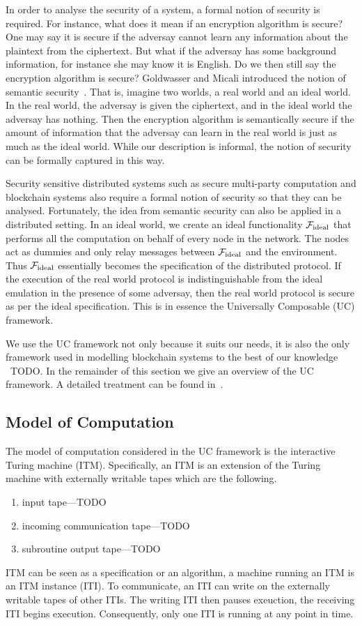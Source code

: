 In order to analyse the security of a system, a formal notion of security is required.
For instance, what does it mean if an encryption algorithm is secure?
One may say it is secure if the adversay cannot learn any information about the plaintext from the ciphertext.
But what if the adversay has some background information, for instance she may know it is English.
Do we then still say the encryption algorithm is secure?
Goldwasser and Micali introduced the notion of semantic security~\cite{goldwasser1982probabilistic}.
That is, imagine two worlds, a real world and an ideal world.
In the real world, the adversay is given the ciphertext,
and in the ideal world the adversay has nothing.
Then the encryption algorithm is semantically secure if the amount of information that the adversay can learn in the real world is just as much as the ideal world.
While our description is informal, the notion of security can be formally captured in this way.

Security sensitive distributed systems such as secure multi-party computation and blockchain systems also require a formal notion of security so that they can be analysed.
Fortunately, the idea from semantic security can also be applied in a distributed setting.
In an ideal world, we create an ideal functionality $\mathcal{F}_{\text{ideal}}$ that performs all the computation on behalf of every node in the network.
The nodes act as dummies and only relay messages between $\mathcal{F}_{\text{ideal}}$ and the environment.
Thus $\mathcal{F}_{\text{ideal}}$ essentially becomes the specification of the distributed protocol.
If the execution of the real world protocol is indistinguishable from the ideal emulation in the presence of some adversay,
then the real world protocol is secure as per the ideal specification.
This is in essence the Universally Composable (UC) framework.

We use the UC framework not only because it suits our needs, 
it is also the only framework used in modelling blockchain systems to the best of our knowledge
~\cite{todo}TODO.
In the remainder of this section we give an overview of the UC framework.
A detailed treatment  can be found in~\cite{canetti2001universally}.

\subsection{Model of Computation}
The model of computation considered in the UC framework is the interactive Turing machine (ITM).
Specifically, an ITM is an extension of the Turing machine with externally writable tapes which are the following.
\begin{enumerate}
\item input tape---TODO
\item incoming communication tape---TODO
\item subroutine output tape---TODO
\end{enumerate}
ITM can be seen as a specification or an algorithm, a machine running an ITM is an ITM instance (ITI).
To communicate, an ITI can write on the externally writable tapes of other ITIs.
The writing ITI then pauses exeuction, the receiving ITI begins execution.
Consequently, only one ITI is running at any point in time.

